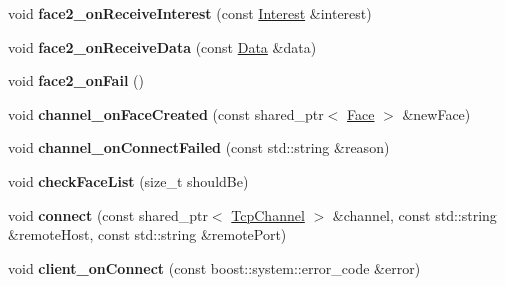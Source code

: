 \begin{DoxyCompactItemize}
\item 
void {\bfseries face2\+\_\+on\+Receive\+Interest} (const \hyperlink{classndn_1_1Interest}{Interest} \&interest)\hypertarget{classnfd_1_1tests_1_1EndToEndFixture_a7b77ce229f425ce63f3d82752974e053}{}\label{classnfd_1_1tests_1_1EndToEndFixture_a7b77ce229f425ce63f3d82752974e053}

\item 
void {\bfseries face2\+\_\+on\+Receive\+Data} (const \hyperlink{classndn_1_1Data}{Data} \&data)\hypertarget{classnfd_1_1tests_1_1EndToEndFixture_a1fc77c4b1badb33a1ac8bfb756298a3a}{}\label{classnfd_1_1tests_1_1EndToEndFixture_a1fc77c4b1badb33a1ac8bfb756298a3a}

\item 
void {\bfseries face2\+\_\+on\+Fail} ()\hypertarget{classnfd_1_1tests_1_1EndToEndFixture_abaadd0cf93e4f4697c99ba623bda110d}{}\label{classnfd_1_1tests_1_1EndToEndFixture_abaadd0cf93e4f4697c99ba623bda110d}

\item 
void {\bfseries channel\+\_\+on\+Face\+Created} (const shared\+\_\+ptr$<$ \hyperlink{classnfd_1_1Face}{Face} $>$ \&new\+Face)\hypertarget{classnfd_1_1tests_1_1EndToEndFixture_a4aac9066eff15592a8cef64bd2771601}{}\label{classnfd_1_1tests_1_1EndToEndFixture_a4aac9066eff15592a8cef64bd2771601}

\item 
void {\bfseries channel\+\_\+on\+Connect\+Failed} (const std\+::string \&reason)\hypertarget{classnfd_1_1tests_1_1EndToEndFixture_a180f9b16d6bb78e0e93add09594a53bf}{}\label{classnfd_1_1tests_1_1EndToEndFixture_a180f9b16d6bb78e0e93add09594a53bf}

\item 
void {\bfseries check\+Face\+List} (size\+\_\+t should\+Be)\hypertarget{classnfd_1_1tests_1_1EndToEndFixture_af0a280b9625c6420d3f75fc1cba8f28b}{}\label{classnfd_1_1tests_1_1EndToEndFixture_af0a280b9625c6420d3f75fc1cba8f28b}

\item 
void {\bfseries connect} (const shared\+\_\+ptr$<$ \hyperlink{classnfd_1_1TcpChannel}{Tcp\+Channel} $>$ \&channel, const std\+::string \&remote\+Host, const std\+::string \&remote\+Port)\hypertarget{classnfd_1_1tests_1_1EndToEndFixture_a2231f829be6d405b90f0fc16de7d8dd3}{}\label{classnfd_1_1tests_1_1EndToEndFixture_a2231f829be6d405b90f0fc16de7d8dd3}

\item 
void {\bfseries client\+\_\+on\+Connect} (const boost\+::system\+::error\+\_\+code \&error)\hypertarget{classnfd_1_1tests_1_1EndToEndFixture_ada83a2d22bd530400349109b4bd4e03b}{}\label{classnfd_1_1tests_1_1EndToEndFixture_ada83a2d22bd530400349109b4bd4e03b}


\end{DoxyCompactItemize}
